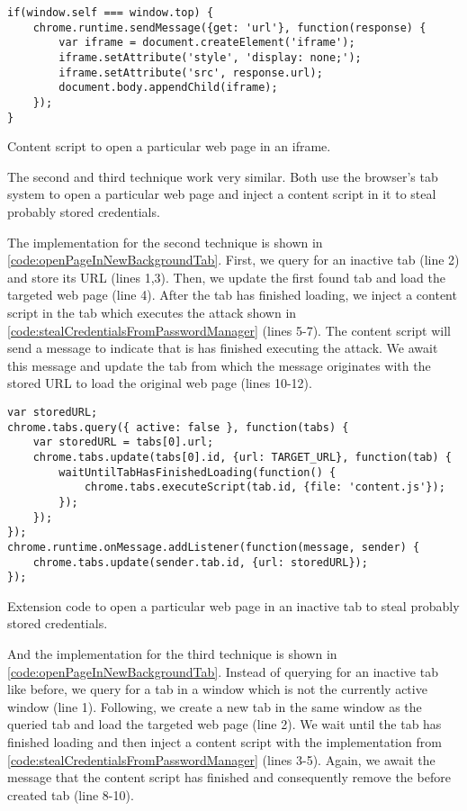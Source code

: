 	\begin{code}
		\begin{lstlisting}
if(window.self === window.top) {
	chrome.runtime.sendMessage({get: 'url'}, function(response) {
		var iframe = document.createElement('iframe');
		iframe.setAttribute('style', 'display: none;');
		iframe.setAttribute('src', response.url);
		document.body.appendChild(iframe);
	});
}
\end{lstlisting}
		\caption{Content script to open a particular web page in an iframe.}
		\label{code:openWebPageInIframe}
	\end{code}
	
	The second and third technique work very similar. Both use the browser's tab system to open a particular web page and inject a content script in it to steal probably stored credentials. 
	
	The implementation for the second technique is shown in \autoref{code:openPageInNewBackgroundTab}. First, we query for an inactive tab (line 2) and store its URL (lines 1,3). Then, we update the first found tab and load the targeted web page (line 4). After the tab has finished loading, we inject a content script in the tab which executes the attack shown in \autoref{code:stealCredentialsFromPasswordManager} (lines 5-7). The content script will send a message to indicate that is has finished executing the attack. We await this message and update the tab from which the message originates with the stored URL to load the original web page (lines 10-12).
		
	\begin{code}
		\begin{lstlisting}
var storedURL;
chrome.tabs.query({ active: false }, function(tabs) {	
	var storedURL = tabs[0].url;
	chrome.tabs.update(tabs[0].id, {url: TARGET_URL}, function(tab) {
		waitUntilTabHasFinishedLoading(function() {
			chrome.tabs.executeScript(tab.id, {file: 'content.js'});	
		});
	});
});
chrome.runtime.onMessage.addListener(function(message, sender) {
	chrome.tabs.update(sender.tab.id, {url: storedURL});
});
\end{lstlisting}
		\caption{Extension code to open a particular web page in an inactive tab to steal probably stored credentials.}
		\label{code:openPageInInactiveTab}
	\end{code}
	
	And the implementation for the third technique is shown in \autoref{code:openPageInNewBackgroundTab}. Instead of querying for an inactive tab like before, we query for a tab in a window which is not the currently active window (line 1). Following, we create a new tab in the same window as the queried tab and load the targeted web page (line 2). We wait until the tab has finished loading and then inject a content script with the implementation from \autoref{code:stealCredentialsFromPasswordManager} (lines 3-5). Again, we await the message that the content script has finished and consequently remove the before created tab (line 8-10).


